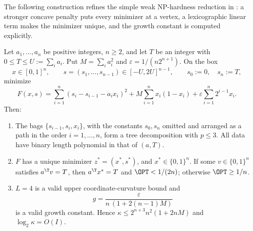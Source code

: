 The following construction refines the simple weak NP-hardness reduction
in \cite[Remark~2]{DelPiaKhajavirad2026}: a stronger concave penalty puts
every minimizer at a vertex, a lexicographic linear term makes the minimizer
unique, and the growth constant is computed explicitly.

\begin{proposition}\label{lim:prop:unique}
Let $a_1,\ldots,a_n$ be positive integers, $n\ge2$, and let $T$ be an
integer with $0\le T\le U:=\sum_ia_i$. Put $M=\sum_ia_i^2$ and
$\varepsilon=1/(n2^{n+1})$. On the box
\[
x\in[0,1]^n,\qquad s=(s_1,\ldots,s_{n-1})\in[-U,2U]^{n-1},
\qquad s_0:=0,\quad s_n:=T,
\]
minimize
\[
F(x,s)=\sum_{i=1}^n(s_i-s_{i-1}-a_ix_i)^2
+M\sum_{i=1}^nx_i(1-x_i)+\varepsilon\sum_{i=1}^n2^{i-1}x_i .
\]
Then:
\begin{enumerate}
\item The bags $\{s_{i-1},s_i,x_i\}$, with the constants $s_0,s_n$ omitted
  and arranged as a path in the order $i=1,\ldots,n$, form a tree
  decomposition with $p\le3$. All data have binary length polynomial in
  that of $(a,T)$.
\item $F$ has a unique minimizer $z^*=(x^*,s^*)$, and $x^*\in\{0,1\}^n$.
  If some $v\in\{0,1\}^n$ satisfies $a^{\T}v=T$, then
  $a^{\T}x^*=T$ and $\OPT<1/(2n)$; otherwise $\OPT\ge1/n$.
\item $L=4$ is a valid upper coordinate-curvature bound and
  \[
  g=\frac{\varepsilon}{n\,(1+2(n-1)M)}
  \]
  is a valid growth constant. Hence
  $\kappa\le2^{n+3}n^2(1+2nM)$ and $\log_2\kappa=O(I)$.
\end{enumerate}
\end{proposition}

